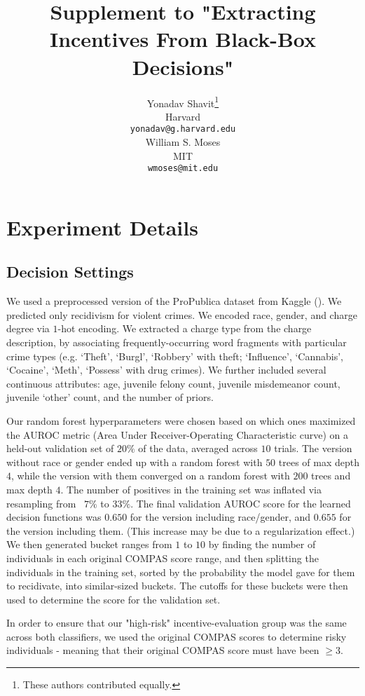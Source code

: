 \documentclass{article}
\title{Supplement to "Extracting Incentives From Black-Box Decisions"}
\author{%
  Yonadav Shavit\thanks{These authors contributed equally.} \\
  Harvard\\
  \texttt{yonadav@g.harvard.edu} \\
   \And
   William S. Moses\footnotemark[1] \\
   MIT \\
   \texttt{wmoses@mit.edu} \\
}
\begin{document}
\maketitle

\section{Experiment Details}
\subsection{Decision Settings}
We used a preprocessed version of the ProPublica dataset from Kaggle (\cite{ofer_2017}). We predicted only recidivism for violent crimes. We encoded race, gender, and charge degree via $1$-hot encoding. We extracted a charge type from the charge description, by associating frequently-occurring word fragments with particular crime types (e.g. `Theft', `Burgl', `Robbery' with theft; `Influence', `Cannabis', `Cocaine', `Meth', `Possess' with drug crimes). We further included several continuous attributes: age, juvenile felony count, juvenile misdemeanor count, juvenile `other' count, and the number of priors.

Our random forest hyperparameters were chosen based on which ones maximized the AUROC metric (Area Under Receiver-Operating Characteristic curve) on a held-out validation set of $20\%$ of the data, averaged across $10$ trials. The version without race or gender ended up with a random forest with $50$ trees of max depth $4$, while the version with them converged on a random forest with $200$ trees and max depth $4$. The number of positives in the training set was inflated via resampling from ~$7\%$ to $33\%$. The final validation AUROC score for the learned decision functions was $0.650$ for the version including race/gender, and $0.655$ for the version including them. (This increase may be due to a regularization effect.) We then generated bucket ranges from $1$ to $10$ by finding the number of individuals in each original COMPAS score range, and then splitting the individuals in the training set, sorted by the probability the model gave for them to recidivate, into similar-sized buckets. The cutoffs for these buckets were then used to determine the score for the validation set.

In order to ensure that our "high-risk" incentive-evaluation group was the same across both classifiers, we used the original COMPAS scores to determine risky individuals - meaning that their original COMPAS score must have been $\geq 3$.
\end{document}
